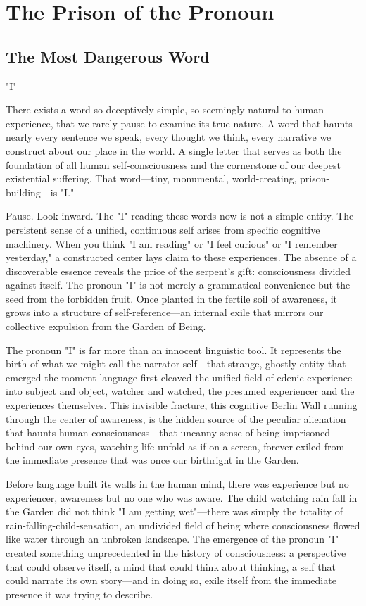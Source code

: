 \chapter{The Prison of the Pronoun}

\section{The Most Dangerous Word}

"I"

There exists a word so deceptively simple, so seemingly natural to human experience, that we rarely pause to examine its true nature. A word that haunts nearly every sentence we speak, every thought we think, every narrative we construct about our place in the world. A single letter that serves as both the foundation of all human self-consciousness and the cornerstone of our deepest existential suffering. That word—tiny, monumental, world-creating, prison-building—is "I."

Pause. Look inward. The "I" reading these words now is not a simple entity. The persistent sense of a unified, continuous self arises from specific cognitive machinery. When you think "I am reading" or "I feel curious" or "I remember yesterday," a constructed center lays claim to these experiences. The absence of a discoverable essence reveals the price of the serpent's gift: consciousness divided against itself. The pronoun "I" is not merely a grammatical convenience but the seed from the forbidden fruit. Once planted in the fertile soil of awareness, it grows into a structure of self-reference—an internal exile that mirrors our collective expulsion from the Garden of Being.

The pronoun "I" is far more than an innocent linguistic tool. It represents the birth of what we might call the narrator self—that strange, ghostly entity that emerged the moment language first cleaved the unified field of edenic experience into subject and object, watcher and watched, the presumed experiencer and the experiences themselves. This invisible fracture, this cognitive Berlin Wall running through the center of awareness, is the hidden source of the peculiar alienation that haunts human consciousness—that uncanny sense of being imprisoned behind our own eyes, watching life unfold as if on a screen, forever exiled from the immediate presence that was once our birthright in the Garden.

Before language built its walls in the human mind, there was experience but no experiencer, awareness but no one who was aware. The child watching rain fall in the Garden did not think "I am getting wet"—there was simply the totality of rain-falling-child-sensation, an undivided field of being where consciousness flowed like water through an unbroken landscape. The emergence of the pronoun "I" created something unprecedented in the history of consciousness: a perspective that could observe itself, a mind that could think about thinking, a self that could narrate its own story—and in doing so, exile itself from the immediate presence it was trying to describe.

